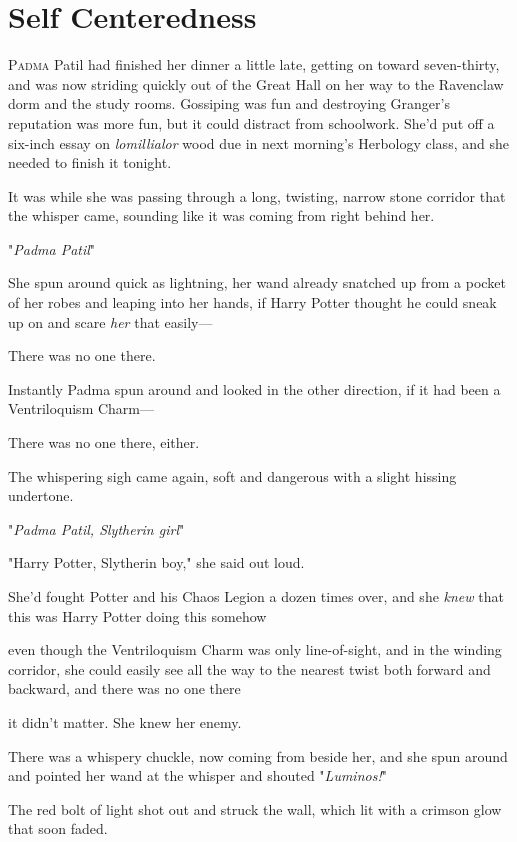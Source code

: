 \chapter{Self Centeredness}

\lettrine{P}{adma} Patil had
finished her dinner a little late, getting on toward seven-thirty, and was now
striding quickly out of the Great Hall on her way to the Ravenclaw dorm and the
study rooms. Gossiping was fun and destroying Granger's reputation was more
fun, but it could distract from schoolwork. She'd put off a six-inch essay on
\emph{lomillialor} wood due in next morning's Herbology class, and she needed
to finish it tonight.

It was while she was passing through a long, twisting, narrow stone corridor
that the whisper came, sounding like it was coming from right behind her.

"\emph{Padma Patil{\el}}"

She spun around quick as lightning, her wand already snatched up from a pocket
of her robes and leaping into her hands, if Harry Potter thought he could sneak
up on and scare \emph{her} that easily—

There was no one there.

Instantly Padma spun around and looked in the other direction, if it had been a
Ventriloquism Charm—

There was no one there, either.

The whispering sigh came again, soft and dangerous with a slight hissing
undertone.

"\emph{Padma Patil, Slytherin girl{\el}}"

"Harry Potter, Slytherin boy," she said out loud.

She'd fought Potter and his Chaos Legion a dozen times over, and she
\emph{knew} that this was Harry Potter doing this somehow{\el}

{\el} even though the Ventriloquism Charm was only line-of-sight, and in the
winding corridor, she could easily see all the way to the nearest twist both
forward and backward, and there was no one there{\el}

{\el} it didn't matter. She knew her enemy.

There was a whispery chuckle, now coming from beside her, and she spun around
and pointed her wand at the whisper and shouted "\emph{Luminos!}"

The red bolt of light shot out and struck the wall, which lit with a crimson
glow that soon faded.

